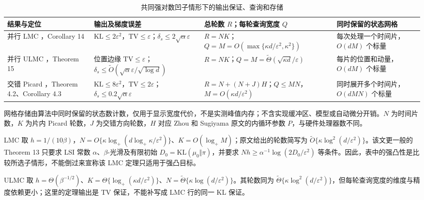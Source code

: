 \documentclass[UTF8,a4paper,zihao=-4,fontset=fandol]{ctexart}
\begin{document}
\begin{table}[htbp]
\centering{}
\caption{共同强对数凹子情形下的输出保证、查询和存储}\label{tab:theory}
\begin{tabular}{@{}>{\raggedright\arraybackslash}p{}>{\raggedright\arraybackslash}p{}>{\raggedright\arraybackslash}p{}>{\raggedright\arraybackslash}p{}@{}}
\toprule
结果与定位 & 输出及梯度误差 & 总轮数 $R$；每轮查询宽度 $Q$ & 同时保留的状态网格 \\
\midrule
并行 LMC \cite{anari2024}，Corollary 14 & $\mathrm{KL}\leq2\varepsilon^2$，$\mathrm{TV}\leq\varepsilon$；$\delta_s\leq2\sqrt\alpha\varepsilon$ & $R=NK$；$Q=M=O(\max\{\kappa d/\varepsilon^2,\kappa^2\})$ & 每次处理一个时间片，$O(dM)$ 个标量 \\[5pt]
并行 ULMC \cite{anari2024}，Theorem 15 & 位置边缘 $\mathrm{TV}\leq\varepsilon$；$\delta_s\leq\widetilde O(\sqrt\alpha\varepsilon/\sqrt{\log d})$ & $R=NK$；$Q=M=\widetilde\Theta(\sqrt{\kappa d}/\varepsilon)$ & 每片的位置和动量，$O(dM)$ 个标量 \\[5pt]
交错 Picard \cite{zhou2025parallel}，Theorem 4.2、Corollary 4.3 & $\mathrm{KL}\leq8\varepsilon^2$，$\mathrm{TV}\leq2\varepsilon$；$\delta_s\leq0.2\sqrt\alpha\varepsilon$ & $R=N+(N+J)H$；$Q\leq MN$，$M=O(\kappa d/\varepsilon^2)$ & 同时展开多个时间片，$O(dMN)$ 个标量 \\[5pt]
\bottomrule
\end{tabular}
\par\smallskip
\parbox{\linewidth}{\footnotesize 网格存储由算法中同时保留的状态数计数，仅用于显示宽度代价，不是实测峰值内存；不含实现缓冲区、模型或自动微分开销。$N$ 为时间片数，$K$ 为片内 Picard 轮数，$J$ 为交错方向轮数，$H$ 对应 Zhou 和 Sugiyama 原文的内循环参数 $P$，与硬件处理器数不同。}
\end{table}

LMC 取 $h=1/(10\beta)$，$N=O\{\kappa\log_+(d\log_+\kappa/\varepsilon^2)\}$、$K=O(\log_+M)$；原文给出的轮数简写为 $\widetilde O\{\kappa\log^2(d/\varepsilon^2)\}$。该文更一般的 Theorem 13 只要求 LSI 常数 $\alpha$、$\beta$-光滑及有限初始 $D_0=\mathrm{KL}(\mu_0\Vert\pi)$，并要求 $Nh\geq\alpha^{-1}\log(2D_0/\varepsilon^2)$ 等条件。因此，表中的强凸性是比较所选子情形，不能倒过来宣称该 LMC 定理只适用于强凸目标。

ULMC 取 $h=\Theta(\beta^{-1/2})$、$K=\Theta\{\log_+(\kappa d/\varepsilon^2)\}$、$N=\widetilde\Theta\{\kappa\log(d/\varepsilon^2)\}$。其轮数同为 $\widetilde\Theta\{\kappa\log^2(d/\varepsilon^2)\}$，但每轮查询宽度的维度与精度依赖更小；这里的定理输出是 TV 保证，不能补写成 LMC 行的同一 KL 保证。
\end{document}
